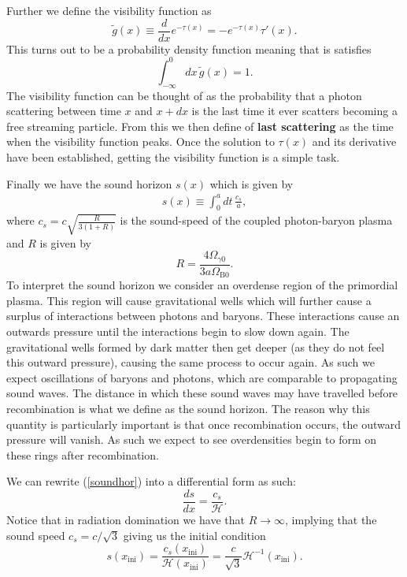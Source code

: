 \documentclass[%
reprint,
 amsmath,amssymb,
 aps,
]{revtex4-2}
\newcommand{\Hp}{\mathcal{H}}
\begin{document}
Further we define the visibility function as
\begin{equation}
	\tilde g(x)\equiv\frac{d}{dx}e^{-\tau(x)}=-e^{-\tau(x)}\tau'(x). \label{gtilde}
\end{equation}
This turns out to be a probability density function meaning that is satisfies
\[\int_{-\infty}^0dx\,\tilde g(x)=1.\]
The visibility function can be thought of as the probability that a photon scattering between time $x$ and $x+dx$ is the last time it ever scatters becoming a free streaming particle. From this we then define of \textbf{last scattering} as the time when the visibility function peaks. Once the solution to $\tau(x)$ and its derivative have been established, getting the visibility function is a simple task.

Finally we have the sound horizon $s(x)$ which is given by
\begin{align}
	s(x)\equiv\int_0^adt\,\frac{c_s}{a}, \label{soundhor}
\end{align}
where $c_s=c\sqrt{\frac{R}{3(1+R)}}$ is the sound-speed of the coupled photon-baryon plasma and $R$ is given by
\begin{equation}
	R=\frac{4\Omega_{\gamma0}}{3a\Omega_{\text{B}0}}.\label{eq:R}
\end{equation}
To interpret the sound horizon we consider an overdense region of the primordial plasma. This region will cause gravitational wells which will further cause a surplus of interactions between photons and baryons. These interactions cause an outwards pressure until the interactions begin to slow down again. The gravitational wells formed by dark matter then get deeper (as they do not feel this outward pressure), causing the same process to occur again. As such we expect oscillations of baryons and photons, which are comparable to propagating sound waves. The distance in which these sound waves may have travelled before recombination is what we define as the sound horizon. The reason why this quantity is particularly important is that once recombination occurs, the outward pressure will vanish. As such we expect to see overdensities begin to form on these rings after recombination. 

We can rewrite (\ref{soundhor}) into a differential form as such:
\begin{equation}
	\frac{ds}{dx}=\frac{c_s}{\Hp}.
\end{equation}
Notice that in radiation domination we have that $R\to\infty$, implying that the sound speed $c_s=c/\sqrt{3}$ giving us the initial condition
\[s(x_{\text{ini}})=\frac{c_s(x_{\text{ini}})}{\Hp(x_{\text{ini}})}=\frac{c}{\sqrt{3}}\Hp^{-1}(x_{\text{ini}}).\] 
\end{document}
